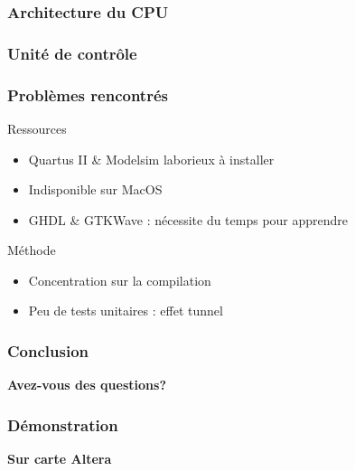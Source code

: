 \documentclass{beamer}
\begin{document}
\begin{frame}
\frametitle{Architecture du CPU}
\end{frame}

\begin{frame}
\frametitle{Unité de contrôle}
\end{frame}

\begin{frame}
\frametitle{Problèmes rencontrés}
\begin{block}{Ressources}
	\begin{itemize}
		\item Quartus II \& Modelsim laborieux à installer
		\item Indisponible sur MacOS
		\item GHDL \& GTKWave : nécessite du temps pour apprendre
	\end{itemize}
\end{block}
\begin{block}{Méthode}
	\begin{itemize}
		\item Concentration sur la compilation
		\item Peu de tests unitaires : effet tunnel
	\end{itemize}
\end{block}
\end{frame}

\begin{frame}
\frametitle{Conclusion}
\end{frame}

\begin{frame}
\begin{center}
	{\Large \textbf{Avez-vous des questions?}}
\end{center}
\end{frame}

\begin{frame}
\frametitle{Démonstration}
\begin{center}
	{\Large \textbf{Sur carte Altera}}
\end{center}
\end{frame}

\end{document}

